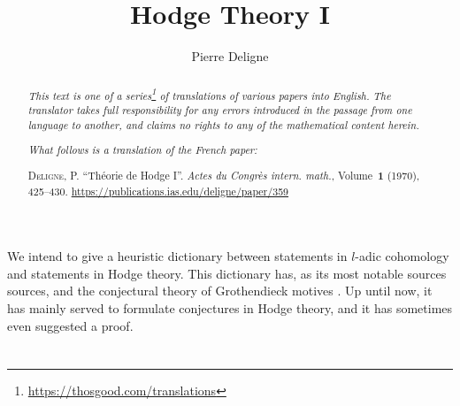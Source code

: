 \documentclass{article}
\title{Hodge Theory I}
\author{Pierre Deligne}
\date{}
\theoremstyle{plain}
\theoremstyle{definition}
\newcommand{\oldpage}[1]{\marginpar{\footnotesize$\Big\vert$ \textit{p.~#1}}}
\begin{document}
\maketitle
\thispagestyle{fancy}

\renewcommand{\abstractname}{Translator's note.}

\begin{abstract}
  \renewcommand*{\thefootnote}{\fnsymbol{footnote}}
  \emph{This text is one of a series\footnote{\url{https://thosgood.com/translations}} of translations of various papers into English.}
  \emph{The translator takes full responsibility for any errors introduced in the passage from one language to another, and claims no rights to any of the mathematical content herein.}
  
  \emph{What follows is a translation of the French paper:}

  \medskip\noindent
  \textsc{Deligne, P.}
  ``Th\'{e}orie de Hodge I''.
  \emph{Actes du Congr\`{e}s intern. math.}, Volume~\textbf{1} (1970), 425--430.
  \url{https://publications.ias.edu/deligne/paper/359}
\end{abstract}

\setcounter{footnote}{0}

\bigskip



\oldpage{425}
We intend to give a heuristic dictionary between statements in $l$-adic cohomology and statements in Hodge theory.
This dictionary has, as its most notable sources sources, \cite{3} and the conjectural theory of Grothendieck motives \cite{2}.
Up until now, it has mainly served to formulate conjectures in Hodge theory, and it has sometimes even suggested a proof.


\section{}
\label{1}
\end{document}
